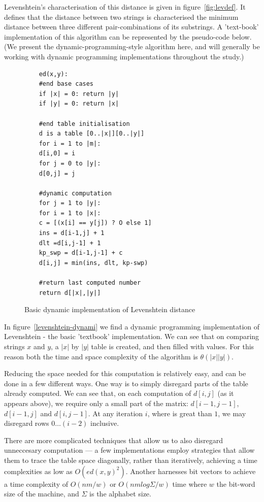 Levenshtein's characterisation of this distance is given in
figure~\ref{fig:levdef}. It defines that the distance between two
strings is characterised the minimum distance between three different
pair-combinations of its substrings. A 'text-book' implementation of
this algorithm can be represented by the pseudo-code below. (We
present the dynamic-programming-style algorithm here, and will
generally be working with dynamic programming implementations
throughout the study.)

\begin{figure}
  \centering
  \begin{lstlisting}
    ed(x,y):
    #end base cases
    if |x| = 0: return |y|
    if |y| = 0: return |x|    

    #end table initialisation
    d is a table [0..|x|][0..|y|]
    for i = 1 to |m|:
    d[i,0] = i
    for j = 0 to |y|:
    d[0,j] = j           
    
    #dynamic computation
    for j = 1 to |y|:
    for i = 1 to |x|:
    c = [(x[i] == y[j]) ? O else 1]
    ins = d[i-1,j] + 1
    dlt =d[i,j-1] + 1
    kp_swp = d[i-1,j-1] + c
    d[i,j] = min(ins, dlt, kp-swp)
    
    #return last computed number
    return d[|x|,|y|]
  \end{lstlisting}
  \caption{Basic dynamic implementation of Levenshtein distance}
  \label{fig:levenshtein-dynamic}
\end{figure}

In figure~\ref{levenshtein-dynami} we find a dynamic programming
implementation of Levenshtein - the basic 'textbook'
implementation. We can see that on comparing strings $x$ and $y$, a
$|x|$ by $|y|$ table is created, and then filled with values. For this
reason both the time and space complexity of the algorithm is $\theta
(|x||y|)$.

Reducing the space needed for this computation is relatively easy, and
can be done in a few different ways. One way is to simply disregard
parts of the table already computed. We can see that, on each
computation of $d[i,j]$ (as it appears above), we require only a small
part of the matrix: $d[i-1,j-1]$, $d[i-1,j]$ and $d[i,j-1]$. At any
iteration $i$, where is great than $1$, we may disregard rows $0 \dots
(i-2)$ inclusive.

There are more complicated techniques that allow us to also disregard
unneccesary computation --- a few implementations employ strategies
that allow them to trace the table space diagonally, rather than
iteratively, achieving a time complexities as low as $O(ed(x,
y)^2)$.\cite{Chang1992} Another harnesses bit vectors to achieve a
time complexity of $O(nm/w)$ or $O(nm log {\Sigma}/w)$ time where $w$
the bit-word size of the machine, and $\Sigma$ is the alphabet
size.\cite{Myers1999}\cite{Hyyro2003} 

